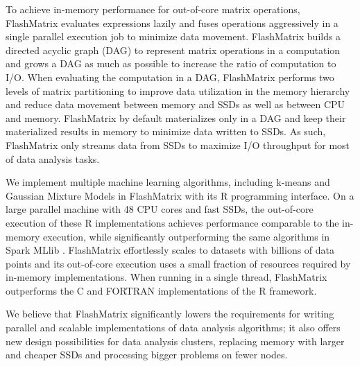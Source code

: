 To achieve in-memory performance for out-of-core matrix operations,
FlashMatrix evaluates expressions lazily and fuses operations aggressively
in a single parallel execution job to minimize data movement. FlashMatrix
builds a directed acyclic graph (DAG) to represent matrix operations
in a computation and grows a DAG as much as possible to increase the ratio of
computation to I/O. When evaluating the computation in a DAG, FlashMatrix
performs two levels of matrix partitioning to improve data utilization in
the memory hierarchy and reduce data movement between memory and SSDs
as well as between CPU and memory. FlashMatrix by default materializes
only  in a DAG and keep their materialized results in
memory to minimize data written to SSDs. As such, FlashMatrix only streams
data from SSDs to maximize I/O throughput for most of data analysis tasks.



We implement multiple machine learning algorithms, including k-means \cite{kmeans}
and Gaussian Mixture Models \cite{gmm} in FlashMatrix with its R programming
interface. On a large parallel machine with 48
CPU cores and fast SSDs, the out-of-core execution of these R implementations
achieves performance comparable to the in-memory execution,
while significantly outperforming the same algorithms in Spark MLlib
\cite{spark}. FlashMatrix effortlessly scales to datasets with billions
of data points and its out-of-core execution uses a small fraction of
resources required by in-memory implementations. 
When running in a single thread, FlashMatrix 
outperforms the C and FORTRAN implementations of the R framework.

We believe that FlashMatrix significantly lowers the requirements for writing parallel
and scalable implementations of data analysis algorithms; it also offers new
design possibilities for data analysis clusters, replacing memory with larger
and cheaper SSDs and processing bigger problems on fewer nodes.
